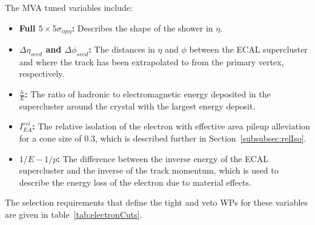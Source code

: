 The MVA tuned variables include:
\begin{itemize}
\item \textbf{Full $5 \times 5 \sigma_{i\eta i\eta}$:} Describes the shape of the shower in $\eta$.
\item \textbf{$\Delta \eta_{seed}$ and $\Delta \phi_{seed}$:} The distances in $\eta$ and $\phi$ between the ECAL supercluster and where the track has been extrapolated to from the primary vertex, respectively.
\item \textbf{$\frac{h}{E}$:} The ratio of hadronic to electromagnetic energy deposited in the supercluster around the crystal with the largest energy deposit.
\item \textbf{$I^{rel}_{EA}$:} The relative isolation of the electron with effective area pileup alleviation for a cone size of 0.3, which is described further in Section~\ref{subsubsec:relIso}.
\item \textbf{$1/E - 1/p$:} The difference between the inverse energy of the ECAL supercluster and the inverse of the track momentum, which is used to describe the energy loss of the electron due to material effects.
\end{itemize}

The selection requirements that define the tight and veto WPs for these variables are given in table~\ref{tab:electronCuts}.

\begin{table}[htbp]
\label{tab:electronCuts}
  \centering
\end{table}

